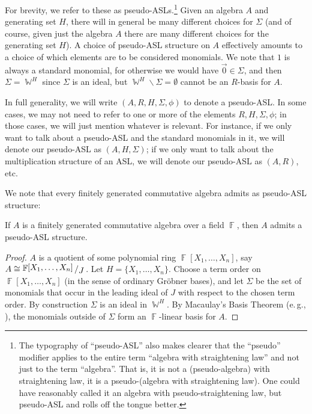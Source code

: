 \documentclass[11pt,reqno]{amsart}
\DeclareMathOperator{\W}{\mathbb{W}}
\DeclareMathOperator{\F}{\mathbb{F}}
\newcommand{\bigslant}[2]{{\raisebox{.2em}{$#1$}\left/\raisebox{-.2em}{$#2$}\right.}}
\theoremstyle{definition}
\numberwithin{equation}{section}
\begin{document}
For brevity, we refer to these as pseudo-ASLs.\footnote{The typography of ``pseudo-ASL'' also makes clearer that the ``pseudo'' modifier applies to the entire term ``algebra with straightening law'' and not just to the term ``algebra''. That is, it is not a (pseudo-algebra) with straightening law, it is a pseudo-(algebra with straightening law). One could have reasonably called it an algebra with pseudo-straightening law, but pseudo-ASL and rolls off the tongue better.} Given an algebra $A$ and generating set $H$, there will in general be many different choices for $\Sigma$ (and of course, given just the algebra $A$ there are many different choices for the generating set $H$). A choice of pseudo-ASL structure on $A$ effectively amounts to a choice of which elements are to be considered monomials. We note that $1$ is always a standard monomial, for otherwise we would have $\vec{0} \in \Sigma$, and then $\Sigma = \W^H$ since $\Sigma$ is an ideal, but $\W^H \backslash \Sigma = \emptyset$ cannot be an $R$-basis for $A$. 

\begin{convention}
\label{conv:pseudo-asl}
In full generality, we will write $(A, R, H, \Sigma, \phi)$ to denote a pseudo-ASL. In some cases, we may not need to refer to one or more of the elements $R, H, \Sigma, \phi$; in those cases, we will just mention whatever is relevant. For instance, if we only want to talk about a pseudo-ASL and the standard monomials in it, we will denote our pseudo-ASL as $(A, H, \Sigma)$; if we only want to talk about the multiplication structure of an ASL, we will denote our pseudo-ASL as $(A, R)$, etc.
\end{convention}

We note that every finitely generated commutative algebra admits as pseudo-ASL structure:

\begin{observation}
\label{obs:fg-pseudo-asl}
If $A$ is a finitely generated commutative algebra over a field $\F$, then $A$ admits a pseudo-ASL structure.
\end{observation}

\begin{proof}
$A$ is a quotient of some polynomial ring $\F[X_1, \ldots, X_n]$, say $A \cong \bigslant{\F[X_1, \ldots, X_n]}{J}$. Let $H = \{X_1, \ldots, X_n\}$. Choose a term order on $\F[X_1, \ldots, X_n]$ (in the sense of ordinary Gröbner bases), and let $\Sigma$ be the set of monomials that occur in the leading ideal of $J$ with respect to the chosen term order. By construction $\Sigma$ is an ideal in $\W^H$. By Macaulay's Basis Theorem (e.\,g., \cite[Theorem~1.5.7]{kreuzer-robbiano-1}), the monomials outside of $\Sigma$ form an $\F$-linear basis for $A$.
\end{proof}
\end{document}
